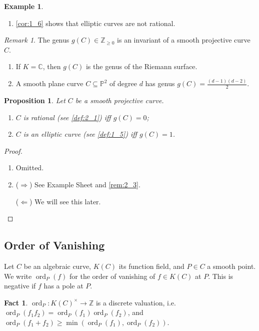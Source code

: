 \documentclass[11pt]{article}
\theoremstyle{definition}
\newtheorem{example}[definition]{Example}
\newtheorem*{fact}{Fact}
\theoremstyle{plain}
\newtheorem{proposition}[definition]{Proposition}
\theoremstyle{remark}
\newtheorem{remark}[definition]{Remark}
\DeclareMathOperator{\ord}{ord}
\newcommand{\ZZ}{\mathbb{Z}}
\newcommand{\CC}{\mathbb{C}}
\newcommand{\PP}{\mathbb{P}}
\begin{document}
\begin{example}
\begin{enumerate}[label=(\alph*)]
        \item \autoref{cor:1_6} shows that elliptic curves are not rational.
    \end{enumerate}
\end{example}

\begin{remark}\label{rem:2_3}
    The genus $g(C) \in \ZZ_{\ge 0}$ is an invariant of a smooth projective curve $C$.
    \begin{enumerate}
        \item If $K = \CC$, then $g(C)$ is the genus of the Riemann surface.
        \item A smooth plane curve $C \subseteq \PP^2$ of degree $d$ has genus $g(C) = \frac{(d-1)(d-2)}{2}$.
    \end{enumerate}
\end{remark}

\begin{proposition}\label{prop:2_4}
    Let $C$ be a smooth projective curve.
    \begin{enumerate}
        \item $C$ is rational (see \autoref{def:2_1}) iff $g(C) = 0$;
        \item $C$ is an elliptic curve (see \autoref{def:1_5}) iff $g(C) = 1$.
    \end{enumerate}
\end{proposition}
\begin{proof}\phantom{}
    \begin{enumerate}
        \item Omitted.

        \item ($\Rightarrow$) See Example Sheet and \autoref{rem:2_3}.

            ($\Leftarrow$) We will see this later. \qedhere
    \end{enumerate}
\end{proof}

\subsection*{Order of Vanishing}

Let $C$ be an algebraic curve, $K(C)$ its function field, and $P \in C$ a smooth point. We write $\ord_P(f)$ for the order of vanishing of $f \in K(C)$ at $P$. This is negative if $f$ has a pole at $P$.

\begin{fact}
    $\ord_P : K(C)^\times \to \ZZ$ is a discrete valuation, i.e. $\ord_P(f_1 f_2) = \ord_P(f_1) \ord_P(f_2)$, and $\ord_P(f_1 + f_2) \ge \min(\ord_P(f_1), \ord_P(f_2))$.
\end{fact}
\end{document}
